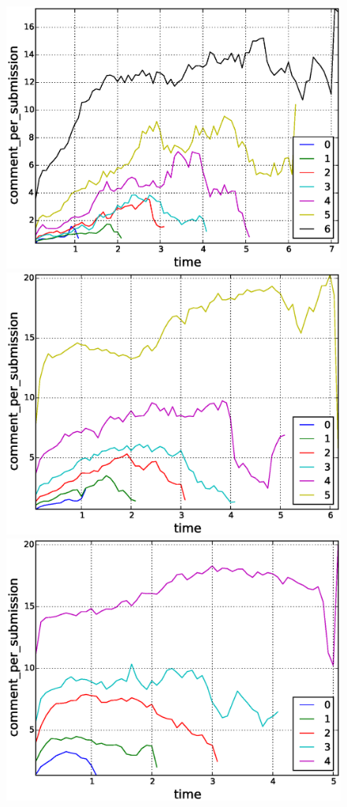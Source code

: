 \begin{figure}[!tb]
\centering
\includegraphics[scale=0.2]{./images/comments_per_submissions_for_surviving_year_for_2008.eps}
\includegraphics[scale=0.2]{./images/comments_per_submissions_for_surviving_year_for_2009.eps}
\includegraphics[scale=0.2]{./images/comments_per_submissions_for_surviving_year_for_2010.eps}

\end{figure}

